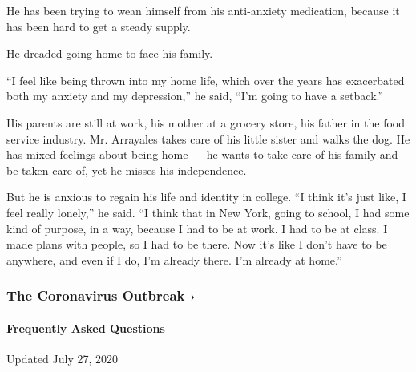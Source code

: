 He has been trying to wean himself from his anti-anxiety medication,
because it has been hard to get a steady supply.

He dreaded going home to face his family.

``I feel like being thrown into my home life, which over the years has
exacerbated both my anxiety and my depression,'' he said, ``I'm going to
have a setback.''

His parents are still at work, his mother at a grocery store, his father
in the food service industry. Mr. Arrayales takes care of his little
sister and walks the dog. He has mixed feelings about being home --- he
wants to take care of his family and be taken care of, yet he misses his
independence.

But he is anxious to regain his life and identity in college. ``I think
it's just like, I feel really lonely,'' he said. ``I think that in New
York, going to school, I had some kind of purpose, in a way, because I
had to be at work. I had to be at class. I made plans with people, so I
had to be there. Now it's like I don't have to be anywhere, and even if
I do, I'm already there. I'm already at home.''

\href{https://www.nytimes.com/news-event/coronavirus?action=click\&pgtype=Article\&state=default\&region=MAIN_CONTENT_3\&context=storylines_faq}{}

\hypertarget{the-coronavirus-outbreak-}{%
\subsubsection{The Coronavirus Outbreak
›}\label{the-coronavirus-outbreak-}}

\hypertarget{frequently-asked-questions}{%
\paragraph{Frequently Asked
Questions}\label{frequently-asked-questions}}

Updated July 27, 2020

